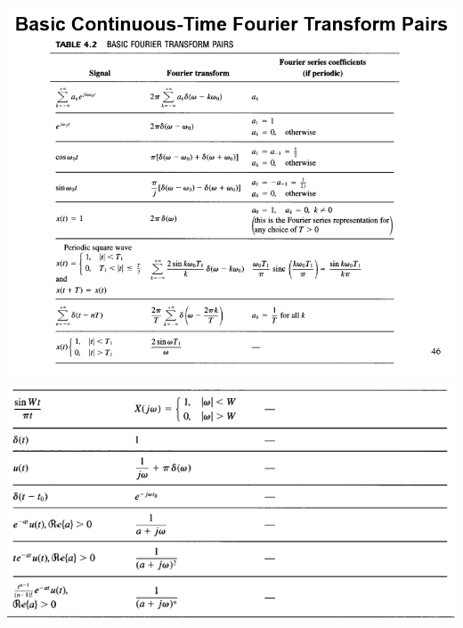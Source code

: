 \documentclass[landscape,a4paper]{article}
\begin{document}
\newpage
\begin{multicols}{2}
\includegraphics[width=\linewidth]{p8.png}
\includegraphics[width=0.9\linewidth]{p9.png}


\end{multicols}
\end{document}
